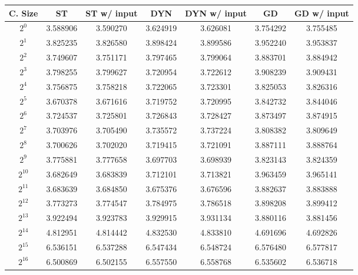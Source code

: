 \begin{tabular}{@{}ccccccc@{}}
\toprule
C. Size & ST & ST w/ input & DYN & DYN w/ input & GD & GD w/ input \\ \midrule
$2^{0}$ & 3.588906 & 3.590270 & 3.624919 & 3.626081 & 3.754292 & 3.755485 \\ \midrule
$2^{1}$ & 3.825235 & 3.826580 & 3.898424 & 3.899586 & 3.952240 & 3.953837 \\ \midrule
$2^{2}$ & 3.749607 & 3.751171 & 3.797465 & 3.799064 & 3.883701 & 3.884942 \\ \midrule
$2^{3}$ & 3.798255 & 3.799627 & 3.720954 & 3.722612 & 3.908239 & 3.909431 \\ \midrule
$2^{4}$ & 3.756875 & 3.758218 & 3.722065 & 3.723301 & 3.825053 & 3.826316 \\ \midrule
$2^{5}$ & 3.670378 & 3.671616 & 3.719752 & 3.720995 & 3.842732 & 3.844046 \\ \midrule
$2^{6}$ & 3.724537 & 3.725801 & 3.726843 & 3.728427 & 3.873497 & 3.874915 \\ \midrule
$2^{7}$ & 3.703976 & 3.705490 & 3.735572 & 3.737224 & 3.808382 & 3.809649 \\ \midrule
$2^{8}$ & 3.700626 & 3.702020 & 3.719415 & 3.721091 & 3.887111 & 3.888764 \\ \midrule
$2^{9}$ & 3.775881 & 3.777658 & 3.697703 & 3.698939 & 3.823143 & 3.824359 \\ \midrule
$2^{10}$ & 3.682649 & 3.683839 & 3.712101 & 3.713821 & 3.963459 & 3.965141 \\ \midrule
$2^{11}$ & 3.683639 & 3.684850 & 3.675376 & 3.676596 & 3.882637 & 3.883888 \\ \midrule
$2^{12}$ & 3.773273 & 3.774547 & 3.784975 & 3.786518 & 3.898208 & 3.899412 \\ \midrule
$2^{13}$ & 3.922494 & 3.923783 & 3.929915 & 3.931134 & 3.880116 & 3.881456 \\ \midrule
$2^{14}$ & 4.812951 & 4.814442 & 4.832530 & 4.833810 & 4.691696 & 4.692826 \\ \midrule
$2^{15}$ & 6.536151 & 6.537288 & 6.547434 & 6.548724 & 6.576480 & 6.577817 \\ \midrule
$2^{16}$ & 6.500869 & 6.502155 & 6.557550 & 6.558768 & 6.535602 & 6.536718 \\ \bottomrule
\end{tabular}
